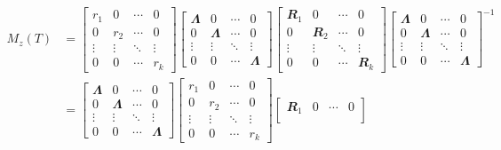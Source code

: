 \documentclass[math, code]{amznotes}
\theoremstyle{remark}
\begin{document}
\begin{align*}
    M_z(T) & = \begin{bmatrix}
        r_1 & 0 & \cdots & 0 \\
        0 & r_2 & \cdots & 0 \\
        \vdots & \vdots & \ddots & \vdots \\
        0 & 0 & \cdots & r_k
    \end{bmatrix}\begin{bmatrix}
        \mathbfit{\Lambda} & 0 & \cdots & 0 \\
        0 & \mathbfit{\Lambda} & \cdots & 0 \\
        \vdots & \vdots & \ddots & \vdots \\
        0 & 0 & \cdots & \mathbfit{\Lambda}
    \end{bmatrix}\begin{bmatrix}
        \mathbfit{R}_1 & 0 & \cdots & 0 \\
        0 & \mathbfit{R}_2 & \cdots & 0 \\
        \vdots & \vdots & \ddots & \vdots \\
        0 & 0 & \cdots & \mathbfit{R}_k
    \end{bmatrix}\begin{bmatrix}
        \mathbfit{\Lambda} & 0 & \cdots & 0 \\
        0 & \mathbfit{\Lambda} & \cdots & 0 \\  
        \vdots & \vdots & \ddots & \vdots \\
        0 & 0 & \cdots & \mathbfit{\Lambda}
    \end{bmatrix}^{-1} \\
    & = \begin{bmatrix}
        \mathbfit{\Lambda} & 0 & \cdots & 0 \\
        0 & \mathbfit{\Lambda} & \cdots & 0 \\
        \vdots & \vdots & \ddots & \vdots \\
        0 & 0 & \cdots & \mathbfit{\Lambda}
    \end{bmatrix}\begin{bmatrix}
        r_1 & 0 & \cdots & 0 \\
        0 & r_2 & \cdots & 0 \\
        \vdots & \vdots & \ddots & \vdots \\
        0 & 0 & \cdots & r_k
    \end{bmatrix}\begin{bmatrix}
        \mathbfit{R}_1 & 0 & \cdots & 0 \\

\end{bmatrix}
\end{align*}
\end{document}
